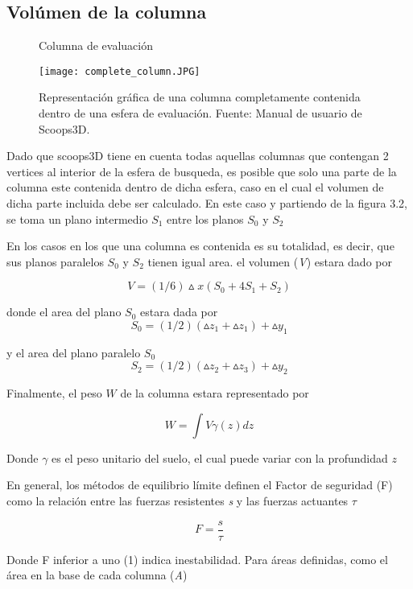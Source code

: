 \subsection{Vol\'umen de la columna}



\begin{figure}[h]
\caption{Columna de evaluaci\'on}
\centering
\texttt{[image: complete\_column.JPG]}
\caption{Representaci\'on gr\'afica de una columna completamente contenida dentro de una esfera de evaluaci\'on. Fuente: Manual de usuario de Scoops3D.}
\label{fig:Interfaz de usuario}
\end{figure}

Dado que scoops3D tiene en cuenta todas aquellas columnas que contengan 2 vertices al interior de la esfera de busqueda, es posible que solo una parte de la columna este contenida dentro de dicha esfera, caso en el cual el volumen de dicha parte incluida debe ser calculado.
En este caso y partiendo de la figura 3.2, se toma un plano intermedio $ S_{1} $ entre los planos $ S_{0} $ y $ S_{2} $

En los casos en los que una columna es contenida es su totalidad, es decir, que sus planos  paralelos $S_{0}$ y $S_{2}$ tienen igual area. el volumen (\textit{V}) estara dado por 

$$\textit{V}= (1/6)\vartriangle \textit{x}(S_{0} + 4S_{1} + S_{2})$$

donde el area del plano $\textit{S}_{0}$ estara dada por
$$ \textit{S}_{0} = (1/2)(\vartriangle z_{1} +\vartriangle z_{1})+\vartriangle \textit{y}_{1}  $$

y el area del plano paralelo $\textit{S}_{0}$
$$ \textit{S}_{2} = (1/2)(\vartriangle z_{2} +\vartriangle z_{3})+\vartriangle \textit{y}_{2}  $$

Finalmente, el peso $W$ de la columna estara representado por

$$\textit{W} = \int \textit{V} \gamma (\textit{z}) \textit{dz} $$

Donde $ \gamma$ es el peso unitario del suelo, el cual puede variar con la profundidad $\textit{z}$

En general, los m\'etodos de equilibrio l\'imite definen el Factor de seguridad (F) como la relaci\'on entre las fuerzas resistentes  \textit{s} y las fuerzas actuantes $\tau$

$$F =\frac{\textit{s}}{\tau}$$

Donde F inferior a uno (1) indica inestabilidad. Para \'areas definidas, como el \'area en la base de cada columna (\textit{A})

